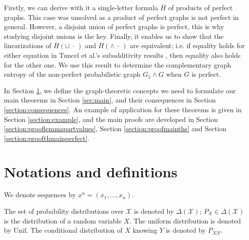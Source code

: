\documentclass[conference,a4paper]{IEEEtran}
\def\ar#1{\textcolor{red}{\footnotesize {(ar: #1)}}}
\begin{document}
Firstly, we can derive with it a single-letter formula $\overline{H}$ of products of perfect graphs. This case was unsolved as a product of perfect graphs is not perfect in general. However, a disjoint union of perfect graphs is perfect, this is why studying disjoint unions is the key. 
Finally, it enables us to show that the linearizations of $\overline{H}(\sqcup \:\cdot\:)$ and $\overline{H}(\wedge \:\cdot\:)$ are equivalent; i.e. if equality holds for either equation in Tuncel et al.'s subadditivity results \cite[Theorem 2]{tuncel2009complementary}, then equality also holds for the other one. We use this result to determine the complementary graph entropy of the non-perfect probabilistic graph $G_5 \wedge G$ when $G$ is perfect.


In Section \ref{section:defs}, we define the graph-theoretic concepts we need to formulate our main theorems in Section \ref{sec:main}, and their consequences in Section \ref{section:consequences}. An example of application for these theorems is given in Section \ref{section:example}, and the main proofs are developed in Section \ref{section:prooflemmapartvalues}, Section \ref{section:proofmainths} and Section \ref{section:proofthmainperfect}.

\section{Notations and definitions}\label{section:defs}

We denote sequences by $x^n = (x_1, ..., x_n)$. %

The set of probability distributions over $\mathcal{X}$ is denoted by $\Delta(\mathcal{X})$; $P_X \in \Delta(\mathcal{X})$ is the distribution of a random variable $X$. The uniform distribution is denoted by $\text{Unif}$. The conditional distribution of $X$ knowing $Y$ is denoted by $P_{X|Y}$.
\end{document}
